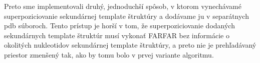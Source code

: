 \indent Preto sme implementovali druhý, jednoduchší spôsob, v ktorom vynechávamé superpoziciovanie sekundárnej template štruktúry a dodávame ju v separátnych pdb súboroch. Tento prístup je horší v tom, že superpoziciovanie dodaných sekundárnych template štruktúr musí vykonať FARFAR bez informácie o okolitých nukleotidov sekundárnej template štruktúry, a preto nie je prehľadávaný priestor zmenšený tak, ako by tomu bolo v prvej variante algoritmu.

